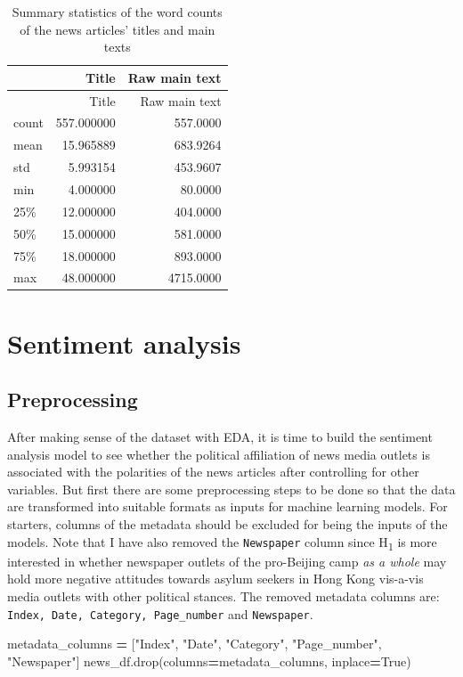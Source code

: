 \documentclass[a4paper, oneside]{report}
\newenvironment{Shaded}{\begin{snugshade}}{\end{snugshade}}
\newcommand{\NormalTok}[1]{#1}
\newcommand{\OperatorTok}[1]{\textcolor[rgb]{0.81,0.36,0.00}{\textbf{#1}}}
\newcommand{\StringTok}[1]{\textcolor[rgb]{0.31,0.60,0.02}{#1}}
\newcommand{\VariableTok}[1]{\textcolor[rgb]{0.00,0.00,0.00}{#1}}
\renewenvironment{Shaded}
{
  \vspace{4pt}%
  \begin{snugshade}%
}{%
  \end{snugshade}%
  \vspace{4pt}%
}
\begin{document}
\begin{longtable}[]{@{}lrr@{}}
\caption{Summary statistics of the word counts of the news articles'
titles and main texts}\tabularnewline
\toprule
& Title & Raw main text \\
\midrule
\endfirsthead
\toprule
& Title & Raw main text \\
\midrule
\endhead
count & 557.000000 & 557.0000 \\
mean & 15.965889 & 683.9264 \\
std & 5.993154 & 453.9607 \\
min & 4.000000 & 80.0000 \\
25\% & 12.000000 & 404.0000 \\
50\% & 15.000000 & 581.0000 \\
75\% & 18.000000 & 893.0000 \\
max & 48.000000 & 4715.0000 \\
\bottomrule
\end{longtable}

\hypertarget{sentiment-analysis}{%
\section{Sentiment analysis}\label{sentiment-analysis}}

\hypertarget{preprocessing}{%
\subsection{Preprocessing}\label{preprocessing}}

After making sense of the dataset with EDA, it is time to build the
sentiment analysis model to see whether the political affiliation of
news media outlets is associated with the polarities of the news
articles after controlling for other variables. But first there are some
preprocessing steps to be done so that the data are transformed into
suitable formats as inputs for machine learning models. For starters,
columns of the metadata should be excluded for being the inputs of the
models. Note that I have also removed the \texttt{Newspaper} column
since H\textsubscript{1} is more interested in whether newspaper outlets
of the pro-Beijing camp \emph{as a whole} may hold more negative
attitudes towards asylum seekers in Hong Kong vis-a-vis media outlets
with other political stances. The removed metadata columns are:
\texttt{Index,\ Date,\ Category,\ Page\_number} and \texttt{Newspaper}.

\begin{Shaded}
\begin{Highlighting}[]
\NormalTok{metadata\_columns }\OperatorTok{=}\NormalTok{ [}\StringTok{"Index"}\NormalTok{, }\StringTok{"Date"}\NormalTok{, }\StringTok{"Category"}\NormalTok{, }\StringTok{"Page\_number"}\NormalTok{, }\StringTok{"Newspaper"}\NormalTok{]}
\NormalTok{news\_df.drop(columns}\OperatorTok{=}\NormalTok{metadata\_columns, inplace}\OperatorTok{=}\VariableTok{True}\NormalTok{)}
\end{Highlighting}
\end{Shaded}
\end{document}
